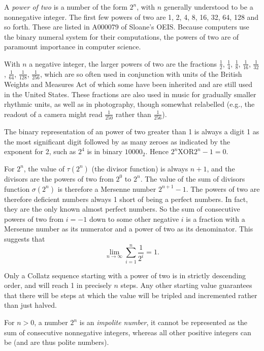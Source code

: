 \documentclass[12pt]{article}
\begin{document}
A {\em power of two} is a number of the form $2^n$, with $n$ generally understood to be a nonnegative integer. The first few powers of two are 1, 2, 4, 8, 16, 32, 64, 128 and so forth. These are listed in A000079 of Sloane's OEIS. Because computers use the binary numeral system for their computations, the powers of two are of paramount importance in computer science.

With $n$ a negative integer, the larger powers of two are the fractions $\frac{1}{2}$, $\frac{1}{4}$, $\frac{1}{8}$, $\frac{1}{16}$, $\frac{1}{32}$, $\frac{1}{64}$, $\frac{1}{128}$, $\frac{1}{256}$, which are so often used in conjunction with units of the British Weights and Measures Act of which some have been inherited and are still used in the United States. These fractions are also used in music for gradually smaller rhythmic units, as well as in photography, though somewhat relabelled (e.g., the readout of a camera might read $\frac{1}{250}$ rather than $\frac{1}{256}$).

The binary representation of an power of two greater than 1 is always a digit 1 as the most significant digit followed by as many zeroes as indicated by the exponent for 2, such as $2^4$ is in binary $10000_2$. Hence $2^n \textrm{XOR} 2^n - 1 = 0$.

For $2^n$, the value of $\tau(2^n)$ (the divisor function) is always $n + 1$, and the divisors are the powers of two from $2^0$ to $2^n$. The value of the sum of divisors function $\sigma(2^n)$ is therefore a Mersenne number $2^{n + 1} - 1$. The powers of two are  therefore deficient numbers always 1 short of being a perfect numbers. In fact, they are the only known almost perfect numbers. So the sum of consecutive powers of two from $i = -1$  down to some other negative $i$ is a fraction with a Mersenne number as its numerator and a power of two as its denominator. This suggests that $$\lim_{n \to \infty} \sum_{i = 1}^n \frac{1}{2^i} = 1.$$

Only a Collatz sequence starting with a power of two is in strictly descending order, and will reach 1 in precisely $n$ steps. Any other starting value guarantees that there will be steps at which the value will be tripled and incremented rather than just halved.

For $n > 0$, a number $2^n$ is an {\em impolite number}, it cannot be represented as the sum of consecutive nonnegative integers, whereas all other positive integers can be (and are thus polite numbers).

\end{document}
